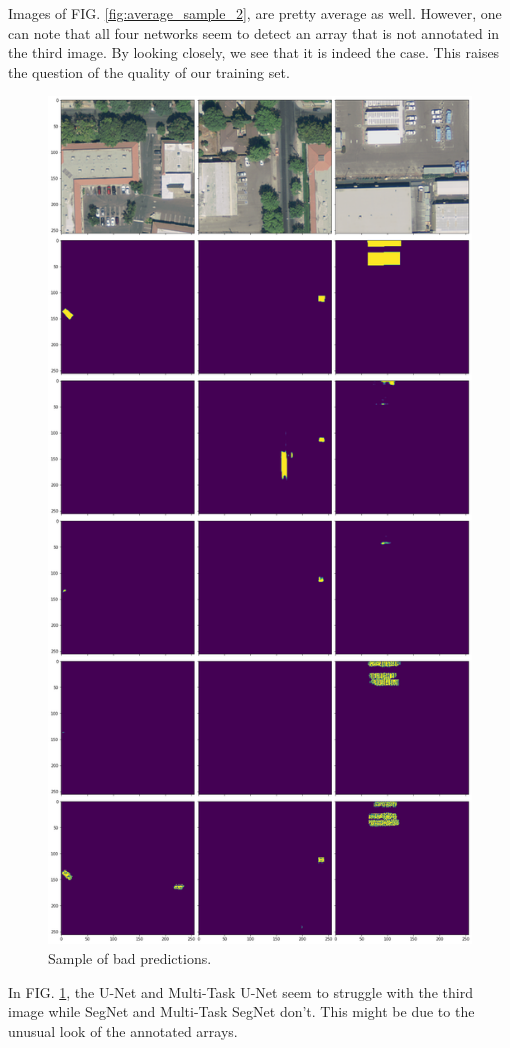 \documentclass[twocolumn,superscriptaddress,aps,nofootinbib]{revtex4-1}
\begin{document}
\newpage

Images of FIG. \ref{fig:average_sample_2}, are pretty average as well. However, one can note that all four networks seem to detect an array that is not annotated in the third image. By looking closely, we see that it is indeed the case. This raises the question of the quality of our training set.

\newpage

\begin{figure}[h]
    \centering
    \includegraphics[width=\columnwidth]{resources/png/terrible.png}
    \caption{Sample of bad predictions.}
    \label{fig:bad_sample}
\end{figure}

In FIG. \ref{fig:bad_sample}, the U-Net and Multi-Task U-Net seem to struggle with the third image while SegNet and Multi-Task SegNet don't. This might be due to the unusual look of the annotated arrays.
\end{document}
